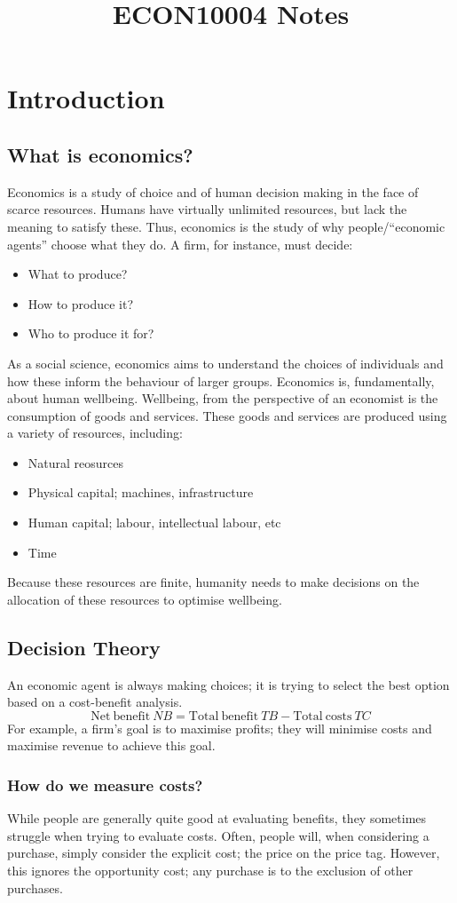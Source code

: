 \documentclass[12pt]{report}
\begin{document}
\title{ECON10004 Notes}
\chapter*{Introduction}

\section*{What is economics?}
Economics is a study of choice and of human decision making in the face of scarce resources.
Humans have virtually unlimited resources, but lack the meaning to satisfy these.
Thus, economics is the study of why people/``economic agents'' choose what they do.
A firm, for instance, must decide:
\begin{itemize}
    \item What to produce?
    \item How to produce it?
    \item Who to produce it for?
\end{itemize}
As a social science, economics aims to understand the choices of individuals and how these inform the behaviour of larger groups.
Economics is, fundamentally, about human wellbeing. Wellbeing, from the perspective of an economist is the consumption
of goods and services. These goods and services are produced using a variety of resources, including:
\begin{itemize}
    \item Natural reosurces 
    \item Physical capital; machines, infrastructure
    \item Human capital; labour, intellectual labour, etc
    \item Time
\end{itemize}
Because these resources are finite, humanity needs to make decisions on the allocation of these resources to optimise wellbeing.

\section*{Decision Theory}
An economic agent is always making choices; it is trying to select the best option based on a 
cost-benefit analysis. 
\[\mathrm{Net\:benefit}\:NB = \mathrm{Total\:benefit}\:TB - \mathrm{Total\:costs}\:TC\]
For example, a firm's goal is to maximise profits; they will minimise costs and maximise revenue to achieve this goal.

\subsection*{How do we measure costs?}
While people are generally quite good at evaluating benefits, they sometimes struggle when
trying to evaluate costs. Often, people will, when considering a purchase, simply consider the 
explicit cost; the price on the price tag. However, this ignores the opportunity cost; any
purchase is to the exclusion of other purchases.
\end{document}
